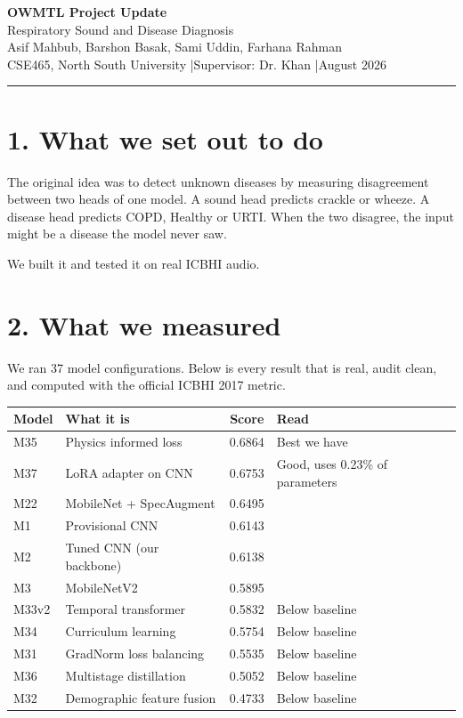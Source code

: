\documentclass[11pt,a4paper]{article}
\begin{document}
\begin{center}
{\LARGE\bfseries OWMTL Project Update}\\[4pt]
{\large Respiratory Sound and Disease Diagnosis}\\[8pt]
{\normalsize Asif Mahbub, Barshon Basak, Sami Uddin, Farhana Rahman}\\[2pt]
{\small CSE465, North South University \quad|\quad Supervisor: Dr. Khan \quad|\quad August 2026}
\end{center}

\vspace{4pt}
\hrule
\vspace{8pt}

\section*{1. What we set out to do}

The original idea was to detect unknown diseases by measuring disagreement between two
heads of one model. A sound head predicts crackle or wheeze. A disease head predicts
COPD, Healthy or URTI. When the two disagree, the input might be a disease the model
never saw.

We built it and tested it on real ICBHI audio.

\section*{2. What we measured}

We ran 37 model configurations. Below is every result that is real, audit clean, and
computed with the official ICBHI 2017 metric.

\vspace{2pt}
\begin{center}
\begin{tabular}{@{}llcl@{}}
\toprule
\textbf{Model} & \textbf{What it is} & \textbf{Score} & \textbf{Read} \\
\midrule
M35 & Physics informed loss      & 0.6864 & Best we have \\
M37 & LoRA adapter on CNN        & 0.6753 & Good, uses 0.23\% of parameters \\
M22 & MobileNet + SpecAugment    & 0.6495 & \\
M1  & Provisional CNN            & 0.6143 & \\
M2  & Tuned CNN (our backbone)   & 0.6138 & \\
M3  & MobileNetV2                & 0.5895 & \\
M33v2 & Temporal transformer     & 0.5832 & Below baseline \\
M34 & Curriculum learning        & 0.5754 & Below baseline \\
M31 & GradNorm loss balancing    & 0.5535 & Below baseline \\
M36 & Multistage distillation    & 0.5052 & Below baseline \\
M32 & Demographic feature fusion & 0.4733 & Below baseline \\
\bottomrule
\end{tabular}
\end{center}
\end{document}
